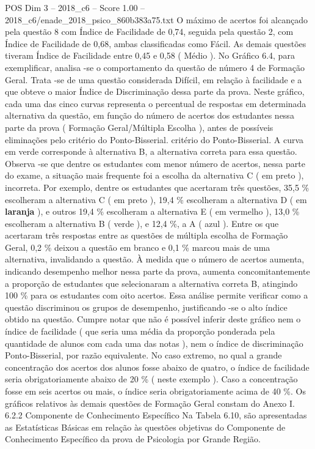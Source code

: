 \begin{textsample}{POS Dim 3 – 2018\_c6 – Score 1.00 – 2018\_c6/enade\_2018\_psico\_860b383a75.txt}
O máximo de acertos foi alcançado pela questão 8 com Índice de Facilidade de 0,74, seguida pela questão 2, com Índice de Facilidade de 0,68, ambas classificadas como Fácil.
As demais questões tiveram Índice de Facilidade entre 0,45 e 0,58 ( Médio ).
No Gráfico 6.4, para exemplificar, analisa -se o comportamento da questão de número 4 de Formação Geral.
Trata -se de uma questão considerada Difícil, em relação à facilidade e a que obteve o maior Índice de Discriminação dessa parte da prova.
Neste gráfico, cada uma das cinco curvas representa o percentual de respostas em determinada alternativa da questão, em função do número de acertos dos estudantes nessa parte da prova ( Formação Geral/Múltipla Escolha ), antes de possíveis eliminações pelo critério do Ponto-Bisserial. critério do Ponto-Bisserial.
A curva em verde corresponde à alternativa B, a alternativa correta para essa questão.
Observa -se que dentre os estudantes com menor número de acertos, nessa parte do exame, a situação mais frequente foi a escolha da alternativa C ( em preto ), incorreta.
Por exemplo, dentre os estudantes que acertaram três questões, 35,5 \% escolheram a alternativa C ( em preto ), 19,4 \% escolheram a alternativa D ( em \textbf{laranja} ), e outros 19,4 \% escolheram a alternativa E ( em vermelho ), 13,0 \% escolheram a alternativa B ( verde ), e 12,4 \%, a A ( azul ).
Entre os que acertaram três respostas entre as questões de múltipla escolha de Formação Geral, 0,2 \% deixou a questão em branco e 0,1 \% marcou mais de uma alternativa, invalidando a questão.
À medida que o número de acertos aumenta, indicando desempenho melhor nessa parte da prova, aumenta concomitantemente a proporção de estudantes que selecionaram a alternativa correta B, atingindo 100 \% para os estudantes com oito acertos.
Essa análise permite verificar como a questão discriminou os grupos de desempenho, justificando -se o alto índice obtido na questão.
Cumpre notar que não é possível inferir deste gráfico nem o índice de facilidade ( que seria uma média da proporção ponderada pela quantidade de alunos com cada uma das notas ), nem o índice de discriminação Ponto-Bisserial, por razão equivalente.
No caso extremo, no qual a grande concentração dos acertos dos alunos fosse abaixo de quatro, o índice de facilidade seria obrigatoriamente abaixo de 20 \% ( neste exemplo ).
Caso a concentração fosse em seis acertos ou mais, o índice seria obrigatoriamente acima de 40 \%.
Os gráficos relativos às demais questões de Formação Geral constam do Anexo I. 6.2.2 Componente de Conhecimento Específico Na Tabela 6.10, são apresentadas as Estatísticas Básicas em relação às questões objetivas do Componente de Conhecimento Específico da prova de Psicologia por Grande Região.

\end{textsample}
